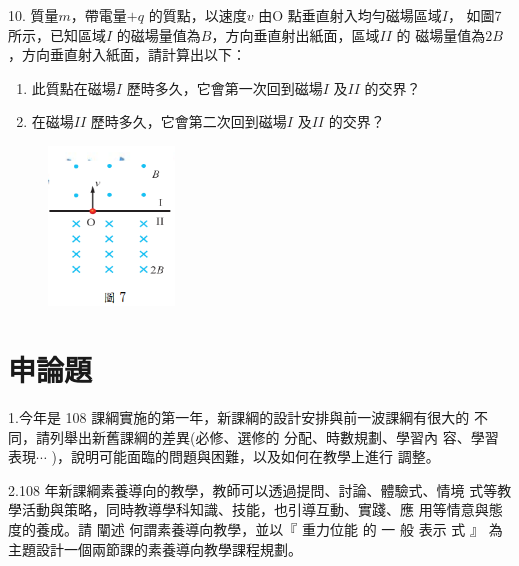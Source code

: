 \documentclass[cn,10pt,math=newtx]{elegantbook}
\begin{document}
\begin{example}
   10. 質量$m$，帶電量$+q$ 的質點，以速度$v$ 由O 點垂直射入均勻磁場區域$I$，
如圖7 所示，已知區域$I$ 的磁場量值為$B$，方向垂直射出紙面，區域$II$ 的
磁場量值為$2B$，方向垂直射入紙面，請計算出以下：
\begin{enumerate}[label=(\arabic*)] 
  \item 此質點在磁場$I$ 歷時多久，它會第一次回到磁場$I$ 及$II$ 的交界？
  \item 在磁場$II$ 歷時多久，它會第二次回到磁場$I$ 及$II$ 的交界？
    \end{enumerate}

    \rightline{[高雄聯招教甄109]}
\end{example}
\begin{solution}
    
\end{solution}
\begin{figure}[htbp]
    \flushright
    \includegraphics[width=0.3\textwidth]{image/109高雄10.png}
  \end{figure}
\newpage

\section{申論題}

\begin{example}
   1.今年是 108 課綱實施的第一年，新課綱的設計安排與前一波課綱有很大的
不同，請列舉出新舊課綱的差異(必修、選修的 分配、時數規劃、學習內
容、學習表現$\cdots$ )，說明可能面臨的問題與困難，以及如何在教學上進行
調整。\\
    \rightline{[高雄聯招教甄109]}
\end{example}
\begin{solution}
    
\end{solution}

\newpage

\begin{example}
   2.108 年新課綱素養導向的教學，教師可以透過提問、討論、體驗式、情境
式等教學活動與策略，同時教導學科知識、技能，也引導互動、實踐、應
用等情意與態度的養成。請 闡述 何謂素養導向教學，並以$『$ 重力位能 的 一
般 表示 式 $』$ 為主題設計一個兩節課的素養導向教學課程規劃。\\
    \rightline{[高雄聯招教甄109]}
\end{example}
\begin{solution}
    
\end{solution}
\end{document}
